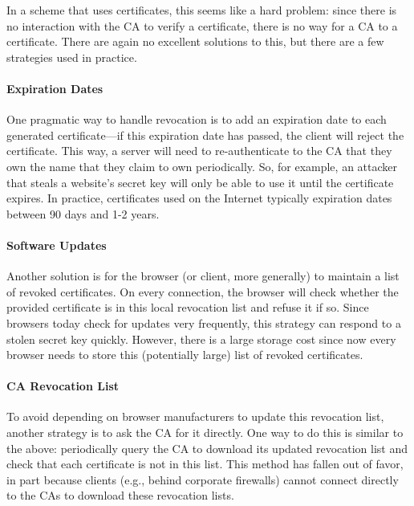 In a scheme that uses certificates, this seems like a hard problem: since there is no interaction with the CA to verify a certificate, there is no way for a CA to  a certificate. There are again no excellent solutions to this, but there are a few strategies used in practice.

\paragraph{Expiration Dates}
One pragmatic way to handle revocation is to add
an expiration date to each generated
certificate---if this expiration date has passed,
the client will reject the certificate. This way,
a server will need to re-authenticate to the CA
that they own the name that they claim to own
periodically. So, for example, an attacker that steals
a website's secret key will only be able to use it 
until the certificate expires.
In practice, certificates used on the Internet
typically expiration dates between 90 days 
and 1-2 years.

\paragraph{Software Updates}
Another solution is for the browser (or client, more generally)
to maintain a list of revoked certificates.
On every connection, the browser will check whether the provided certificate is in this local revocation list and refuse it if so.
Since browsers today check for updates very frequently, this strategy can respond to a stolen secret key quickly. However, there is a large storage cost since now every browser needs to store this (potentially large) list of revoked certificates.

\paragraph{CA Revocation List}
To avoid depending on browser manufacturers to update this revocation list, another strategy is to ask the CA for it directly. One way to do this is similar to the above: periodically query the CA to download its updated revocation list and check that each certificate is not in this list. This method has fallen out of favor, in part because clients (e.g., behind corporate firewalls) cannot connect directly to the CAs to download these revocation lists.

